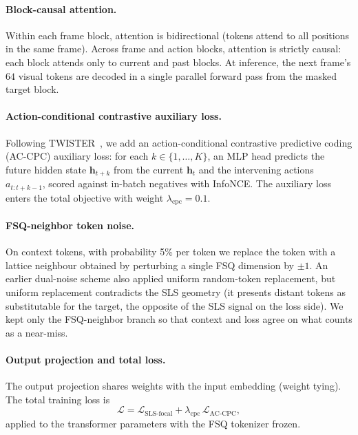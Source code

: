 \documentclass{article}
\newcommand{\ntokens}{64}
\begin{document}
\paragraph{Block-causal attention.}
Within each frame block, attention is bidirectional (tokens attend to all positions in the same frame).
Across frame and action blocks, attention is strictly causal: each block attends only to current and past blocks.
At inference, the next frame's $\ntokens$ visual tokens are decoded in a single parallel forward pass from the masked target block.

\paragraph{Action-conditional contrastive auxiliary loss.}
Following TWISTER~\citep{burchi2025twister}, we add an action-conditional contrastive predictive coding (AC-CPC) auxiliary loss: for each $k \in \{1, \dots, K\}$, an MLP head predicts the future hidden state $\mathbf{h}_{t+k}$ from the current $\mathbf{h}_t$ and the intervening actions $a_{t:t+k-1}$, scored against in-batch negatives with InfoNCE.
The auxiliary loss enters the total objective with weight $\lambda_\text{cpc} = 0.1$.

\paragraph{FSQ-neighbor token noise.}
On context tokens, with probability 5\% per token we replace the token with a lattice neighbour obtained by perturbing a single FSQ dimension by $\pm 1$.
An earlier dual-noise scheme also applied uniform random-token replacement, but uniform replacement contradicts the SLS geometry (it presents distant tokens as substitutable for the target, the opposite of the SLS signal on the loss side).
We kept only the FSQ-neighbor branch so that context and loss agree on what counts as a near-miss.

\paragraph{Output projection and total loss.}
The output projection shares weights with the input embedding (weight tying).
The total training loss is
\begin{equation}
  \mathcal{L} = \mathcal{L}_\text{SLS-focal} + \lambda_\text{cpc}\, \mathcal{L}_\text{AC-CPC},
\end{equation}
applied to the transformer parameters with the FSQ tokenizer frozen.
\end{document}
